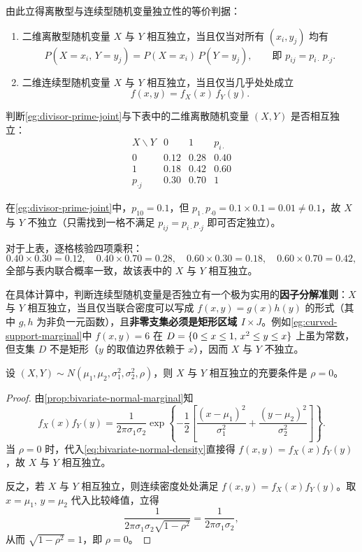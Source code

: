 由此立得离散型与连续型随机变量独立性的等价判据：
\begin{enumerate}
  \item 二维离散型随机变量 $X$ 与 $Y$ 相互独立，当且仅当对所有 $(x_i,y_j)$ 均有
  \[
    P(X=x_i,\,Y=y_j)=P(X=x_i)\,P(Y=y_j),\qquad\text{即 }p_{ij}=p_{i\cdot}\,p_{\cdot j}.
  \]
  \item 二维连续型随机变量 $X$ 与 $Y$ 相互独立，当且仅当几乎处处成立
  \[
    f(x,y)=f_X(x)\,f_Y(y).
  \]
\end{enumerate}

\begin{example}[title={二维离散分布的独立性判别}]
\label{eg:discrete-independent-table}
判断\cref{eg:divisor-prime-joint}与下表中的二维离散随机变量 $(X,Y)$ 是否相互独立：
\[
\begin{array}{c|cc|c}
  X\backslash Y & 0 & 1 & p_{i\cdot} \\ \hline
  0 & 0.12 & 0.28 & 0.40 \\
  1 & 0.18 & 0.42 & 0.60 \\ \hline
  p_{\cdot j} & 0.30 & 0.70 & 1
\end{array}
\]
\begin{solution}
在\cref{eg:divisor-prime-joint}中，$p_{10}=0.1$，但 $p_{1\cdot}p_{\cdot 0}=0.1\times 0.1=0.01\ne 0.1$，故 $X$ 与 $Y$ 不独立（只需找到一格不满足 $p_{ij}=p_{i\cdot}p_{\cdot j}$ 即可否定独立）。

对于上表，逐格核验四项乘积：
\[
  0.40\times 0.30=0.12,\quad 0.40\times 0.70=0.28,\quad
  0.60\times 0.30=0.18,\quad 0.60\times 0.70=0.42,
\]
全部与表内联合概率一致，故该表中的 $X$ 与 $Y$ 相互独立。
\end{solution}
\end{example}

在具体计算中，判断连续型随机变量是否独立有一个极为实用的\textbf{因子分解准则}：$X$ 与 $Y$ 相互独立，当且仅当联合密度可以写成 $f(x,y)=g(x)h(y)$ 的形式（其中 $g,h$ 为非负一元函数），且\textbf{非零支集必须是矩形区域 $I\times J$}。例如\cref{eg:curved-support-marginal}中 $f(x,y)=6$ 在 $D=\{0\le x\le 1,\,x^2\le y\le x\}$ 上虽为常数，但支集 $D$ 不是矩形（$y$ 的取值边界依赖于 $x$），因而 $X$ 与 $Y$ 不独立。

\begin{proposition}[二维正态分布的独立性判据]
\label{prop:bivariate-normal-indep}
设 $(X,Y)\sim N(\mu_1,\mu_2,\sigma_1^2,\sigma_2^2,\rho)$，则 $X$ 与 $Y$ 相互独立的充要条件是 $\rho=0$。
\end{proposition}
\begin{proof}
由\cref{prop:bivariate-normal-marginal}知
\[
  f_X(x)f_Y(y)=\frac{1}{2\pi\sigma_1\sigma_2}
  \exp\left\{-\frac{1}{2}\left[\frac{(x-\mu_1)^2}{\sigma_1^2}+\frac{(y-\mu_2)^2}{\sigma_2^2}\right]\right\}.
\]
当 $\rho=0$ 时，代入\eqref{eq:bivariate-normal-density}直接得 $f(x,y)=f_X(x)f_Y(y)$，故 $X$ 与 $Y$ 相互独立。

反之，若 $X$ 与 $Y$ 相互独立，则连续密度处处满足 $f(x,y)=f_X(x)f_Y(y)$。取 $x=\mu_1,\,y=\mu_2$ 代入比较峰值，立得
\[
  \frac{1}{2\pi\sigma_1\sigma_2\sqrt{1-\rho^2}}=\frac{1}{2\pi\sigma_1\sigma_2},
\]
从而 $\sqrt{1-\rho^2}=1$，即 $\rho=0$。
\end{proof}

